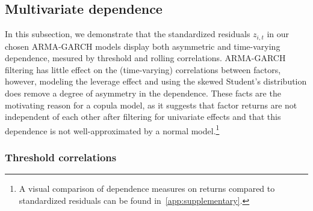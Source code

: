 
\subsection{Multivariate dependence} %

In this subsection, we demonstrate that the standardized residuals $z_{i,t}$ in our chosen ARMA-GARCH models display both asymmetric and time-varying dependence, mesured by threshold and rolling correlations. ARMA-GARCH filtering has little effect on the (time-varying) correlations between factors, however, modeling the leverage effect and using the skewed Student's distribution does remove a degree of asymmetry in the dependence. These facts are the motivating reason for a copula model, as it suggests that factor returns are not independent of each other after filtering for univariate effects and that this dependence is not well-approximated by a normal model.\footnote{A visual comparison of dependence measures on returns compared to standardized residuals can be found in~\autoref{app:supplementary}.}



\subsubsection{Threshold correlations}

